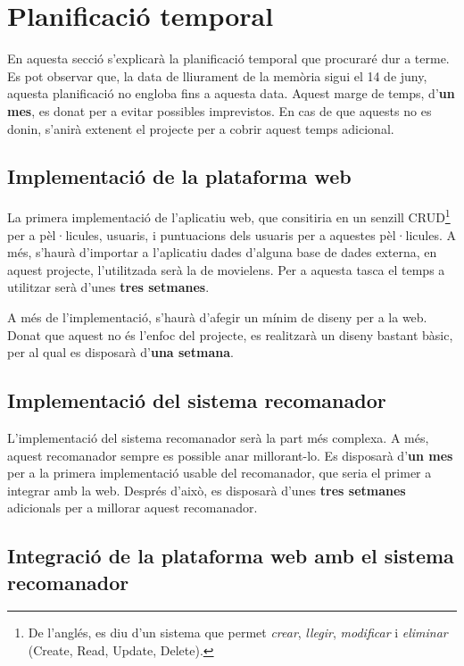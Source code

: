 \chapter{Planificació temporal}

En aquesta secció s'explicarà la planificació temporal que procuraré dur a terme. Es pot observar que, la data de lliurament de la memòria sigui el 14 de juny, aquesta planificació no engloba fins a aquesta data. Aquest marge de temps, d'\textbf{un mes}, es donat per a evitar possibles imprevistos. En cas de que aquests no es donin, s'anirà extenent el projecte per a cobrir aquest temps adicional.

\section{Implementació de la plataforma web}

La primera implementació de l'aplicatiu web, que consitiria en un senzill CRUD\footnote{De l'anglés, es diu d'un sistema que permet \emph{crear}, \emph{llegir}, \emph{modificar} i \emph{eliminar} (Create, Read, Update, Delete).} per a pèl·licules, usuaris, i puntuacions dels usuaris per a aquestes pèl·licules. A més, s'haurà d'importar a l'aplicatiu dades d'alguna base de dades externa, en aquest projecte, l'utilitzada serà la de movielens\cite{movielens-dataset}. Per a aquesta tasca el temps a utilitzar serà d'unes \textbf{tres setmanes}.

A més de l'implementació, s'haurà d'afegir un mínim de diseny per a la web. Donat que aquest no és l'enfoc del projecte, es realitzarà un diseny bastant bàsic, per al qual es disposarà d'\textbf{una setmana}.

\section{Implementació del sistema recomanador}

L'implementació del sistema recomanador serà la part més complexa. A més, aquest recomanador sempre es possible anar millorant-lo. Es disposarà d'\textbf{un mes} per a la primera implementació usable del recomanador, que seria el primer a integrar amb la web. Després d'això, es disposarà d'unes \textbf{tres setmanes} adicionals per a millorar aquest recomanador.

\section{Integració de la plataforma web amb el sistema recomanador}

